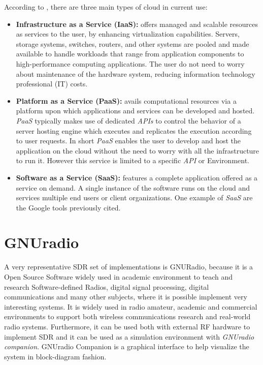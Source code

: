 According to \cite{dayananda2012}, there are three main types of cloud in
current use:

\begin{itemize}

    \item \textbf{Infrastructure as a Service (IaaS):} offers managed and
    scalable resources as services to the user, by enhancing virtualization
    capabilities. Servers, storage systems, switches, routers, and other systems
    are pooled and made available to handle workloads that range from
    application components to high-performance computing applications. The user
    do not need to worry about maintenance of the hardware system, reducing
    information technology professional (IT) costs.

    \item \textbf{Platform as a Service (PaaS):} avails computational resources
    via a platform upon which applications and services can be developed and
    hosted. \textit{PaaS} typically makes use of dedicated \textit{APIs} to
    control the behavior of a server hosting engine which executes and
    replicates the execution according to user requests. In short \textit{PaaS}
    enables the user to develop and host the application on the cloud without
    the need to worry with all the infrastructure to run it. However this
    service is limited to a specific \textit{API} or Environment.

    \item \textbf{Software as a Service (SaaS):} features a complete application
    offered as a service on demand. A single instance of the software runs on the
    cloud and services multiple end users or client organizations. One example of
    \emph{SaaS} are the Google tools previously cited.

\end{itemize}

\section{GNUradio}
\label{sdr:gnuradio}

A very representative SDR set of implementations is GNURadio, because it is a
Open Source Software widely used in academic environment to teach and research
Software-defined Radios, digital signal processing, digital communications and
many other subjects, where it is possible implement very interesting systems. It
is widely used in radio amateur, academic and commercial environments
\cite{web:gnuradio} to support both wireless communications research and
real-world radio systems. Furthermore, it can be used both with external RF
hardware to implement SDR and it can be used as a simulation environment with
\textit{GNUradio companion}. GNUradio Companion is a graphical interface to help
visualize the system in block-diagram fashion.

